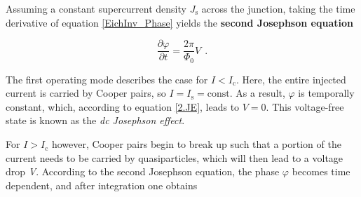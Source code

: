 
Assuming a constant supercurrent density $J_\mathrm{s}$ across the junction, taking the time derivative of equation \eqref{EichInv_Phase} yields the \textbf{second Josephson equation} \cite{Josephson1965}

\begin{equation}
\label{2.JE}
\frac{\partial\varphi}{\partial t} = \frac{2\pi}{\Phi_0}V \ \ .
\end{equation}




The first operating mode describes the case for $I<I_\mathrm{c}$. Here, the entire injected current is carried by Cooper pairs, so $I=I_\mathrm{s}=\mathrm{const}$. As a result, $\varphi$ is temporally constant, which, according to equation \eqref{2.JE}, leads to $V=0$. This voltage-free state is known as the \textit{dc Josephson effect}.

For $I>I_\mathrm{c}$ however, Cooper pairs begin to break up such that a portion of the current needs to be carried by quasiparticles, which will then lead to a voltage drop \textit{V}. According to the second Josephson equation, the phase $\varphi$ becomes time dependent, and after integration one obtains

